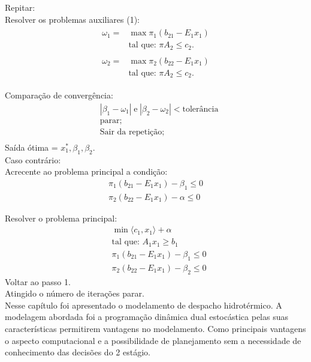 Repitar:\\
Resolver  os problemas auxiliares (1):
\begin{align}
  \begin{split}	
	  \omega_1 = &\max \pi_1 (b_{21} - E_1x_1 ) \\
	&\mbox{tal que: }\pi A_2  \leq c_2.
  \end{split}
 	\label{auxdual1}
\end{align}
\begin{align}
  \begin{split}	
	  \omega_2 = &\max \pi_2 (b_{22} - E_1x_1 ) \\
	&\mbox{tal que: }\pi A_2  \leq c_2.
  \end{split}
 	\label{auxdual2}
\end{align}

Compara\c c\~ao de converg\^encia:
\begin{align*}
	&|\beta_1 - \omega_1|\hspace{3pt} \mbox{e} \hspace{3pt} |\beta_2 - \omega_2|< \mbox{toler\^ancia}\\
	&\mbox{parar;}\\
	&\mbox{Sair da repeti\c c\~ao;}\\
\end{align*}
Sa\'ida \'otima = $x_1^{*}, \beta_1, \beta_2.$ \\
Caso contr\'ario:\\

Acrecente ao problema principal a condi\c c\~ao:
\begin{align*}
	\pi_1(b_{21} - E_1x_1) - \beta_1 \leq 0\\
	\pi_2(b_{22} - E_1x_1) - \alpha \leq 0
\end{align*}

Resolver o problema principal:
\begin{align*}
&\min \langle c_1,x_1\rangle + \alpha \nonumber\\
&\mbox{tal que: }	A_1 x_1 \geq b_1\\
&\pi_1(b_{21} - E_1x_1) - \beta_1 \leq 0\\
&\pi_2(b_{22} - E_1x_1) - \beta_2 \leq 0
\end{align*}
Voltar ao passo 1.\\
Atingido o número de itera\c c\~oes parar.\\
Nesse cap\'itulo foi apresentado o modelamento de despacho hidrot\'ermico. A modelagem abordada foi a programa\c c\~ao
din\^amica dual estoc\'astica pelas suas caracter\'isticas permitirem vantagens no modelamento. Como principais
vantagens o aspecto computacional e a possibilidade de planejamento sem a necessidade de conhecimento das decis\~oes do 2
est\'agio.

